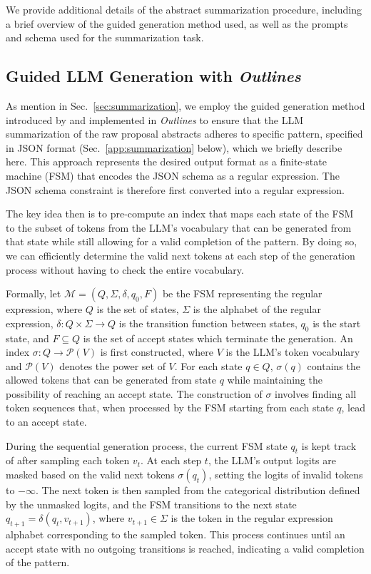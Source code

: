 \documentclass{article} %
\newcommand{\package}[1]{\textsl{#1}\xspace}
\begin{document}
We provide additional details of the abstract summarization procedure, including a brief overview of the guided generation method used, as well as the prompts and schema used for the summarization task.

\subsection{Guided LLM Generation with \package{Outlines}}
\label{app:guided-generation}

As mention in Sec.~\ref{sec:summarization}, we employ the guided generation method introduced by \citet{willard2023efficient} and implemented in \package{Outlines} to ensure that the LLM summarization of the raw proposal abstracts adheres to specific pattern, specified in JSON format (Sec.~\ref{app:summarization} below), which we briefly describe here. This approach represents the desired output format as a finite-state machine (FSM) that encodes the JSON schema as a regular expression. The JSON schema constraint is therefore first converted into a regular expression.

The key idea then is to pre-compute an index that maps each state of the FSM to the subset of tokens from the LLM's vocabulary that can be generated from that state while still allowing for a valid completion of the pattern. By doing so, we can efficiently determine the valid next tokens at each step of the generation process without having to check the entire vocabulary.

Formally, let $\mathcal{M} = (Q, \Sigma, \delta, q_0, F)$ be the FSM representing the regular expression, where $Q$ is the set of states, $\Sigma$ is the alphabet of the regular expression, $\delta: Q \times \Sigma \rightarrow Q$ is the transition function between states, $q_0$ is the start state, and $F\subseteq Q$ is the set of accept states which terminate the generation. An index $\sigma: Q \rightarrow \mathcal{P}(V)$ is first constructed, where $V$ is the LLM's token vocabulary and $\mathcal{P}(V)$ denotes the power set of $V$. For each state $q \in Q$, $\sigma(q)$ contains the allowed tokens that can be generated from state $q$ while maintaining the possibility of reaching an accept state. The construction of $\sigma$ involves finding all token sequences that, when processed by the FSM starting from each state $q$, lead to an accept state.

During the sequential generation process, the current FSM state $q_t$ is kept track of after sampling each token $v_t$. At each step $t$, the LLM's output logits are masked based on the valid next tokens $\sigma(q_t)$, setting the logits of invalid tokens to $-\infty$. The next token is then sampled from the categorical distribution defined by the unmasked logits, and the FSM transitions to the next state $q_{t+1} = \delta(q_t, v_{t+1})$, where $v_{t+1} \in \Sigma$ is the token in the regular expression alphabet corresponding to the sampled token. This process continues until an accept state with no outgoing transitions is reached, indicating a valid completion of the pattern.
\end{document}
